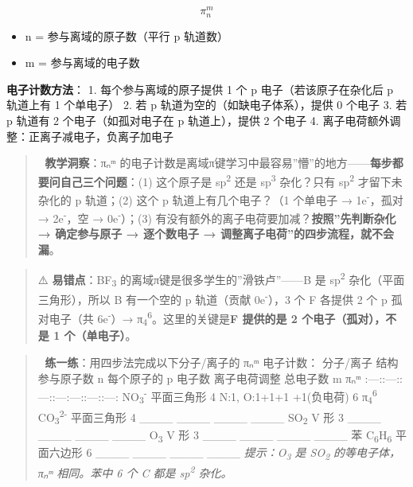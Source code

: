 \documentclass[a4paper,11pt]{ctexart}
\providecommand{\tightlist}{\setlength{\itemsep}{0pt}\setlength{\parskip}{0pt}}
\begin{document}
\[
\pi_n^m
\]

\begin{itemize}
\tightlist
\item
  n = 参与离域的原子数（平行 p 轨道数）
\item
  m = 参与离域的电子数
\end{itemize}

\textbf{电子计数方法}：
1. 每个参与离域的原子提供 1 个 p 电子（若该原子在杂化后 p 轨道上有 1 个单电子）
2. 若 p 轨道为空的（如缺电子体系），提供 0 个电子
3. 若 p 轨道有 2 个电子（如孤对电子在 p 轨道上），提供 2 个电子
4. 离子电荷额外调整：正离子减电子，负离子加电子

\begin{quote}
🧠 \textbf{教学洞察}：πₙᵐ 的电子计数是离域π键学习中最容易''懵''的地方------\textbf{每步都要问自己三个问题}：(1) 这个原子是 sp\textsuperscript{2} 还是 sp\textsuperscript{3} 杂化？只有 sp\textsuperscript{2} 才留下未杂化的 p 轨道；(2) 这个 p 轨道上有几个电子？（1 个单电子 → 1e\textsuperscript{-}，孤对 → 2e\textsuperscript{-}，空 → 0e\textsuperscript{-}）；(3) 有没有额外的离子电荷要加减？\textbf{按照''先判断杂化 → 确定参与原子 → 逐个数电子 → 调整离子电荷''的四步流程，就不会漏}。
\end{quote}

\begin{quote}
⚠️ \textbf{易错点}：BF\textsubscript{3} 的离域π键是很多学生的''滑铁卢''------B 是 sp\textsuperscript{2} 杂化（平面三角形），所以 B 有一个空的 p 轨道（贡献 0e\textsuperscript{-}），3 个 F 各提供 2 个 p 孤对电子（共 6e\textsuperscript{-}）→ π\textsubscript{4}\textsuperscript{6}。这里的关键是\textbf{F 提供的是 2 个电子（孤对），不是 1 个（单电子）}。
\end{quote}

\begin{quote}
📝 \textbf{练一练}：用四步法完成以下分子/离子的 πₙᵐ 电子计数：
\textbar{} 分子/离子 \textbar{} 结构 \textbar{} 参与原子数 n \textbar{} 每个原子的 p 电子数 \textbar{} 离子电荷调整 \textbar{} 总电子数 m \textbar{} πₙᵐ \textbar{}
\textbar:---:\textbar:---:\textbar:---:\textbar:---\textbar:---:\textbar:---:\textbar:---:\textbar{}
\textbar{} NO\textsubscript{3}\textsuperscript{-} \textbar{} 平面三角形 \textbar{} 4 \textbar{} N:1, O:1+1+1 \textbar{} +1(负电荷) \textbar{} 6 \textbar{} π\textsubscript{4}\textsuperscript{6} \textbar{}
\textbar{} CO\textsubscript{3}\textsuperscript{2-} \textbar{} 平面三角形 \textbar{} 4 \textbar{} \_\_\_\_ \textbar{} \_\_\_\_ \textbar{} \_\_\_\_ \textbar{} \_\_\_\_ \textbar{}
\textbar{} SO\textsubscript{2} \textbar{} V 形 \textbar{} 3 \textbar{} \_\_\_\_ \textbar{} \_\_\_\_ \textbar{} \_\_\_\_ \textbar{} \_\_\_\_ \textbar{}
\textbar{} O\textsubscript{3} \textbar{} V 形 \textbar{} 3 \textbar{} \_\_\_\_ \textbar{} \_\_\_\_ \textbar{} \_\_\_\_ \textbar{} \_\_\_\_ \textbar{}
\textbar{} 苯 C\textsubscript{6}H\textsubscript{6} \textbar{} 平面六边形 \textbar{} 6 \textbar{} \_\_\_\_ \textbar{} \_\_\_\_ \textbar{} \_\_\_\_ \textbar{} \_\_\_\_ \textbar{}
\emph{提示：O\textsubscript{3} 是 SO\textsubscript{2} 的等电子体，πₙᵐ 相同。苯中 6 个 C 都是 sp\textsuperscript{2} 杂化。}
\end{quote}
\end{document}
